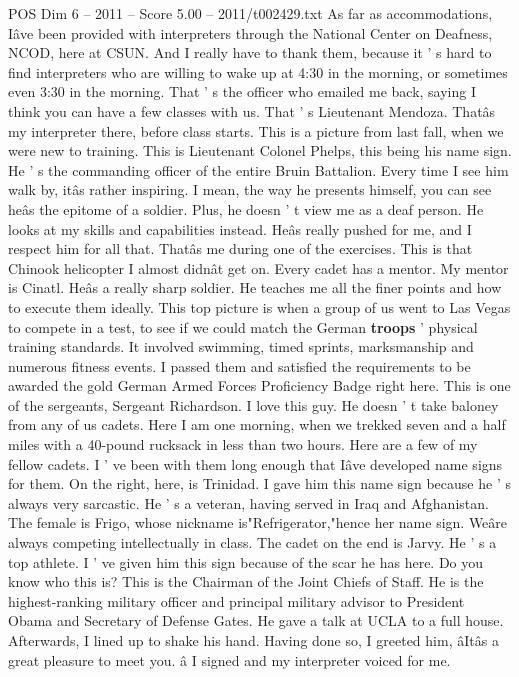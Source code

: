 \begin{textsample}{POS Dim 6 – 2011 – Score 5.00 – 2011/t002429.txt}
As far as accommodations, Iâve been provided with interpreters through the National Center on Deafness, NCOD, here at CSUN.
And I really have to thank them, because it ' s hard to find interpreters who are willing to wake up at 4:30 in the morning, or sometimes even 3:30 in the morning.
That ' s the officer who emailed me back, saying I think you can have a few classes with us.
That ' s Lieutenant Mendoza.
Thatâs my interpreter there, before class starts.
This is a picture from last fall, when we were new to training.
This is Lieutenant Colonel Phelps, this being his name sign.
He ' s the commanding officer of the entire Bruin Battalion.
Every time I see him walk by, itâs rather inspiring.
I mean, the way he presents himself, you can see heâs the epitome of a soldier.
Plus, he doesn ' t view me as a deaf person.
He looks at my skills and capabilities instead.
Heâs really pushed for me, and I respect him for all that.
Thatâs me during one of the exercises.
This is that Chinook helicopter I almost didnât get on.
Every cadet has a mentor.
My mentor is Cinatl.
Heâs a really sharp soldier.
He teaches me all the finer points and how to execute them ideally.
This top picture is when a group of us went to Las Vegas to compete in a test, to see if we could match the German \textbf{troops} ' physical training standards.
It involved swimming, timed sprints, marksmanship and numerous fitness events.
I passed them and satisfied the requirements to be awarded the gold German Armed Forces Proficiency Badge right here.
This is one of the sergeants, Sergeant Richardson.
I love this guy.
He doesn ' t take baloney from any of us cadets.
Here I am one morning, when we trekked seven and a half miles with a 40-pound rucksack in less than two hours.
Here are a few of my fellow cadets.
I ' ve been with them long enough that Iâve developed name signs for them.
On the right, here, is Trinidad.
I gave him this name sign because he ' s always very sarcastic.
He ' s a veteran, having served in Iraq and Afghanistan.
The female is Frigo, whose nickname is"Refrigerator,"hence her name sign.
Weâre always competing intellectually in class.
The cadet on the end is Jarvy.
He ' s a top athlete.
I ' ve given him this sign because of the scar he has here.
Do you know who this is?
This is the Chairman of the Joint Chiefs of Staff.
He is the highest-ranking military officer and principal military advisor to President Obama and Secretary of Defense Gates.
He gave a talk at UCLA to a full house.
Afterwards, I lined up to shake his hand.
Having done so, I greeted him, âItâs a great pleasure to meet you. â I signed and my interpreter voiced for me.

\end{textsample}

